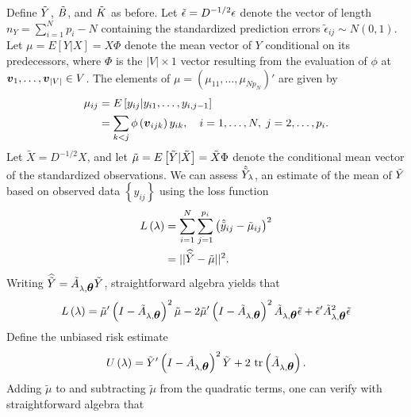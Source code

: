 Define  $\tilde{Y}$, $\tilde{B}$, and $\tilde{K}$ as before. Let $\tilde{\epsilon} = D^{-1/2} \epsilon$ denote the vector of length $n_Y = \sum_{i = 1}^N p_i - N$ containing the standardized prediction errors $\tilde{\epsilon}_{ij} \sim N\left(0,1\right)$. Let ${\mu} =  E\left[Y \vert X \right] = X \Phi$  denote the mean vector of $Y$ conditional on its predecessors, where $\Phi$ is the $\vert V \vert \times 1$ vector resulting from the evaluation of $\phi$ at $\mbox{\boldmath $v$}_{1},\dots, \mbox{\boldmath $v$}_{\vert V \vert} \in V$. The elements of $\mu = \left(\mu_{11},\dots, \mu_{Np_N} \right)'$ are given by
\begin{align*}
\mu_{ij} &= E\left[y_{ij}\vert y_{i1}, \dots, y_{i,j-1}\right] \\
&= \sum_{k<j} \phi\left(\mbox{\boldmath $v$}_{ijk} \right) y_{ik}, \quad i = 1,\dots, N, \;j = 2,\dots, p_i. 
\end{align*}
\noindent
Let $\tilde{X} = D^{-1/2}X$, and let $\tilde{\mu} =E\left[\tilde{Y} \vert \tilde{X} \right]  = \tilde{X}\Phi$ denote the conditional mean vector of the standardized observations. We can assess $\hat{\tilde{Y}}_\lambda$, an estimate of the mean of $\tilde{Y}$ based on observed data $\left\{y_{ij}\right\}$ using the loss function
\begin{align}
\begin{split}
L\left(\lambda\right) &= \sum_{i = 1}^N \sum_{j = 1}^{p_i} \left(\hat{\tilde{y}}_{ij} - \tilde{\mu}_{ij} \right)^2\\
&= \vert \vert \widehat{\tilde{Y}} - \tilde{\mu} \vert \vert^2.
\end{split}
\end{align}
\noindent
Writing $\widehat{\tilde{Y}} = \tilde{A}_{\lambda,\mbox{\boldmath $\theta$}} \tilde{Y}$, straightforward algebra yields that 
\begin{align} 
L\left(\lambda\right) = \tilde{\mu}'\left( I - \tilde{A}_{\lambda,\mbox{\boldmath $\theta$}} \right)^2\tilde{\mu} - 2\tilde{\mu}'\left( I - \tilde{A}_{\lambda,\mbox{\boldmath $\theta$}} \right)^2 \tilde{A}_{\lambda,\mbox{\boldmath $\theta$}} \tilde{\epsilon} + \tilde{\epsilon}' \tilde{A}_{\lambda,\mbox{\boldmath $\theta$}}^2 \tilde{\epsilon}
\end{align}
Define the unbiased risk estimate
\begin{equation*} 
U\left(\lambda\right) = \tilde{Y}'\left( I - \tilde{A}_{\lambda,\mbox{\boldmath $\theta$}} \right)^2\tilde{Y} + {2}\mbox{ tr}\left(\tilde{A}_{\lambda,\mbox{\boldmath $\theta$}}\right).
\end{equation*}
 \noindent
Adding $\tilde{\mu}$ to and subtracting $\tilde{\mu}$ from the quadratic terms, one can verify with straightforward algebra that
